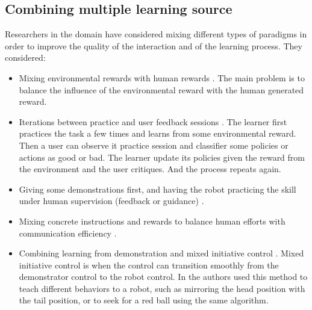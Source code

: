 \subsection{Combining multiple learning source}

Researchers in the domain have considered mixing different types of paradigms in order to improve the quality of the interaction and of the learning process. They considered:

\begin{itemize}

\item Mixing environmental rewards with human rewards \cite{knox2010combining,griffith2013policy,grave2013learning}. The main problem is to balance the influence of the environmental reward with the human generated reward.

\item Iterations between practice and user feedback sessions \cite{judah2010reinforcement}. The learner first practices the task a few times and learns from some environmental reward. Then a user can observe it practice session and classifier some policies or actions as good or bad. The learner update its policies given the reward from the environment and the user critiques. And the process repeats again.

\item Giving some demonstrations first, and having the robot practicing the skill under human supervision (feedback or guidance) \cite{nicolescu2003natural,pardowitz2007incremental}.

\item Mixing concrete instructions and rewards to balance human efforts with communication efficiency \cite{pilarski2012between}.

\item Combining learning from demonstration and mixed initiative control \cite{grollman2007dogged}. Mixed initiative control is when the control can transition smoothly from the demonstrator control to the robot control. In \cite{grollman2007dogged} the authors used this method to teach different behaviors to a robot, such as mirroring the head position with the tail position, or to seek for a red ball using the same algorithm.


\end{itemize}
